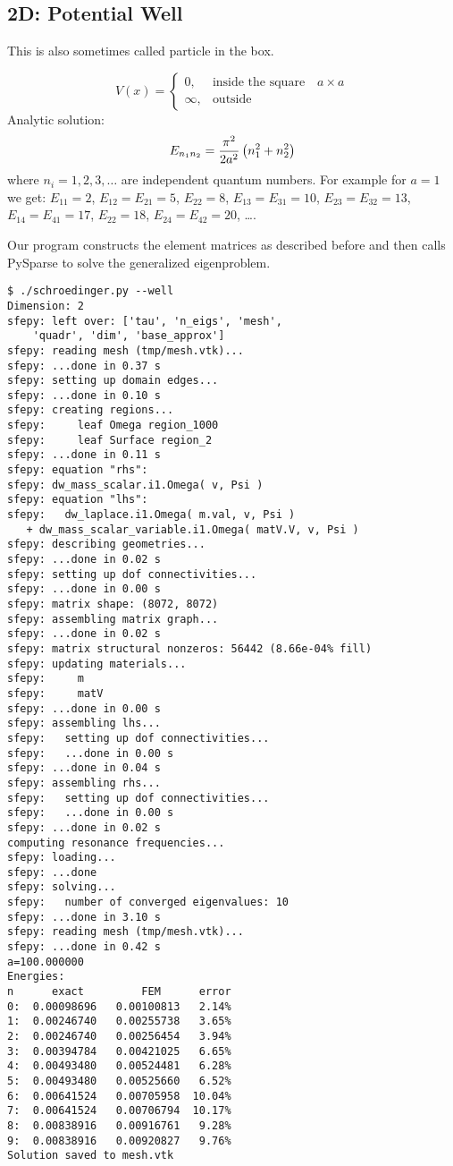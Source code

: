\subsection{2D: Potential Well}

This is also sometimes called particle in the box.

$$V(x)=\begin{cases}0,&\text{inside the square}\quad a\times a \\
\infty, & \text{outside}\end{cases}$$
Analytic solution:
$$E_{n_1n_2}={\pi^2\over2a^2}\left(n_1^2 + n_2^2\right)$$
where $n_i = 1, 2, 3, \dots$ are independent quantum numbers.
For example for $a=1$ we get:
$E_{11}=2$,
$E_{12}=E_{21}=5$,
$E_{22}=8$,
$E_{13}=E_{31}=10$,
$E_{23}=E_{32}=13$,
$E_{14}=E_{41}=17$,
$E_{22}=18$,
$E_{24}=E_{42}=20$, \dots.

Our program constructs the element matrices as described before and then calls
PySparse\cite{geus} to solve the generalized eigenproblem.


\begin{lstlisting}
$ ./schroedinger.py --well
Dimension: 2
sfepy: left over: ['tau', 'n_eigs', 'mesh',
    'quadr', 'dim', 'base_approx']
sfepy: reading mesh (tmp/mesh.vtk)...
sfepy: ...done in 0.37 s
sfepy: setting up domain edges...
sfepy: ...done in 0.10 s
sfepy: creating regions...
sfepy:     leaf Omega region_1000
sfepy:     leaf Surface region_2
sfepy: ...done in 0.11 s
sfepy: equation "rhs":
sfepy: dw_mass_scalar.i1.Omega( v, Psi )
sfepy: equation "lhs":
sfepy:   dw_laplace.i1.Omega( m.val, v, Psi )
   + dw_mass_scalar_variable.i1.Omega( matV.V, v, Psi )
sfepy: describing geometries...
sfepy: ...done in 0.02 s
sfepy: setting up dof connectivities...
sfepy: ...done in 0.00 s
sfepy: matrix shape: (8072, 8072)
sfepy: assembling matrix graph...
sfepy: ...done in 0.02 s
sfepy: matrix structural nonzeros: 56442 (8.66e-04% fill)
sfepy: updating materials...
sfepy:     m
sfepy:     matV
sfepy: ...done in 0.00 s
sfepy: assembling lhs...
sfepy:   setting up dof connectivities...
sfepy:   ...done in 0.00 s
sfepy: ...done in 0.04 s
sfepy: assembling rhs...
sfepy:   setting up dof connectivities...
sfepy:   ...done in 0.00 s
sfepy: ...done in 0.02 s
computing resonance frequencies...
sfepy: loading...
sfepy: ...done
sfepy: solving...
sfepy:   number of converged eigenvalues: 10
sfepy: ...done in 3.10 s
sfepy: reading mesh (tmp/mesh.vtk)...
sfepy: ...done in 0.42 s
a=100.000000
Energies:
n      exact         FEM      error
0:  0.00098696   0.00100813   2.14%
1:  0.00246740   0.00255738   3.65%
2:  0.00246740   0.00256454   3.94%
3:  0.00394784   0.00421025   6.65%
4:  0.00493480   0.00524481   6.28%
5:  0.00493480   0.00525660   6.52%
6:  0.00641524   0.00705958  10.04%
7:  0.00641524   0.00706794  10.17%
8:  0.00838916   0.00916761   9.28%
9:  0.00838916   0.00920827   9.76%
Solution saved to mesh.vtk
\end{lstlisting}

